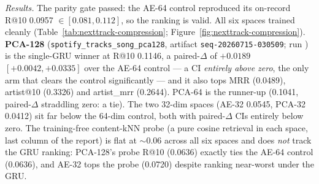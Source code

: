 \documentclass[11pt]{article}
\newcommand{\runid}[1]{\texttt{\small\seqsplit{#1}}}
\newcommand{\dsid}[1]{\texttt{\small #1}}
\begin{document}
\emph{Results.} The parity gate passed: the AE-64 control reproduced its
on-record R@10 \num{0.0957} $\in [0.081, 0.112]$, so the ranking is valid. All
six spaces trained cleanly (Table~\ref{tab:nexttrack-compression};
Figure~\ref{fig:nexttrack-compression}). \textbf{PCA-128}
(\dsid{spotify\_tracks\_song\_pca128}, artifact \texttt{seq-20260715-030509};
run \runid{run-20260715-042100-a1d9d}) is the single-GRU winner at R@10
\num{0.1146}, a paired-$\Delta$ of $+\num{0.0189}$ $[+0.0042, +0.0335]$ over the
AE-64 control --- a CI \emph{entirely above zero}, the only arm that clears the
control significantly --- and it also tops MRR (\num{0.0489}), artist@10
(\num{0.3326}) and artist\_mrr (\num{0.2644}). PCA-64 is the runner-up
(\num{0.1041}, paired-$\Delta$ straddling zero: a tie). The two 32-dim spaces
(AE-32 \num{0.0545}, PCA-32 \num{0.0412}) sit far below the 64-dim control, both
with paired-$\Delta$ CIs entirely below zero. The training-free content-kNN
probe (a pure cosine retrieval in each space, last column of the report) is flat
at $\sim$0.06 across all six spaces and does \emph{not} track the GRU ranking:
PCA-128's probe R@10 (\num{0.0636}) exactly ties the AE-64 control
(\num{0.0636}), and AE-32 tops the probe (\num{0.0720}) despite ranking
near-worst under the GRU.
\end{document}
